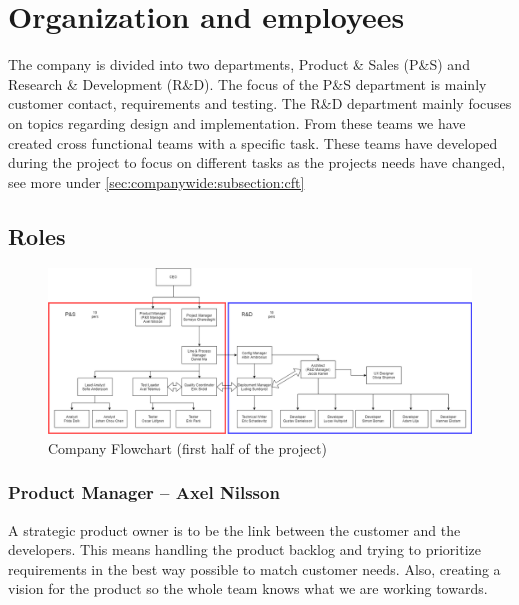 \section{Organization and employees}
\label{sec:companywide}
The company is divided into two departments, Product \& Sales (P\&S) and Research \& Development (R\&D). The focus of the P\&S department is mainly customer contact, requirements and testing. The R\&D department mainly focuses on topics regarding design and implementation. From these teams we have created cross functional teams with a specific task. These teams have developed during the project to focus on different tasks as the projects needs have changed, see more under \ref{sec:companywide:subsection:cft} %
\subsection{Roles}
\begin{figure}[ht]
    \centering\includegraphics[width=1 \linewidth]{figures/company flowchart.png}
    \caption{Company Flowchart (first half of the project)}
    \label{fig:example2}
\end{figure}


\subsubsection*{Product Manager – Axel Nilsson}
A strategic product owner is to be the link between the customer and the developers. This means handling the product backlog and trying to prioritize requirements in the best way possible to match customer needs. Also, creating a vision for the product so the whole team knows what we are working towards. 

